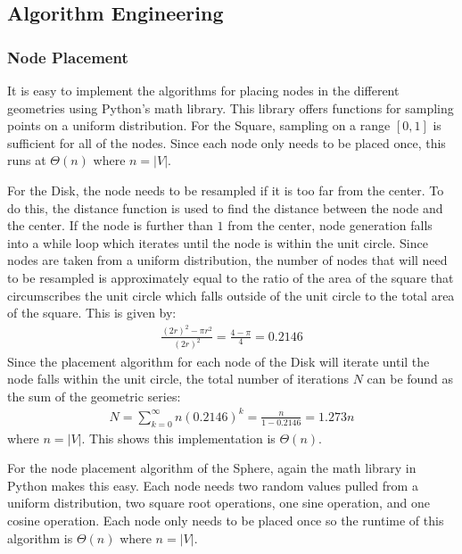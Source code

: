 \documentclass{article}
\begin{document}
    \subsection{Algorithm Engineering}

        \subsubsection{Node Placement}
        It is easy to implement the algorithms for placing nodes in the different geometries using Python's math library. This library offers functions for sampling points on a uniform distribution. For the Square, sampling on a range $[0,1]$ is sufficient for all of the nodes. Since each node only needs to be placed once, this runs at $\Theta(n)$ where $n = |V|$.
        \par
        For the Disk, the node needs to be resampled if it is too far from the center. To do this, the distance function is used to find the distance between the node and the center. If the node is further than $1$ from the center, node generation falls into a while loop which iterates until the node is within the unit circle. Since nodes are taken from a uniform distribution, the number of nodes that will need to be resampled is approximately equal to the ratio of the area of the square that circumscribes the unit circle which falls outside of the unit circle to the total area of the square. This is given by:
        \begin{align}
            \frac{(2r)^2-\pi r^2}{(2r)^2} = \frac{4-\pi}{4} = 0.2146
        \end{align}
        Since the placement algorithm for each node of the Disk will iterate until the node falls within the unit circle, the total number of iterations $N$ can be found as the sum of the geometric series:
        \begin{align}
            N = \sum_{k=0}^{\infty} n (0.2146)^k = \frac{n}{1-0.2146} = 1.273n
        \end{align}
        where $n = |V|$. This shows this implementation is $\Theta\left(n\right)$.
        \par
        For the node placement algorithm of the Sphere, again the math library in Python makes this easy. Each node needs two random values pulled from a uniform distribution, two square root operations, one sine operation, and one cosine operation. Each node only needs to be placed once so the runtime of this algorithm is $\Theta(n)$ where $n = |V|$.
\end{document}
